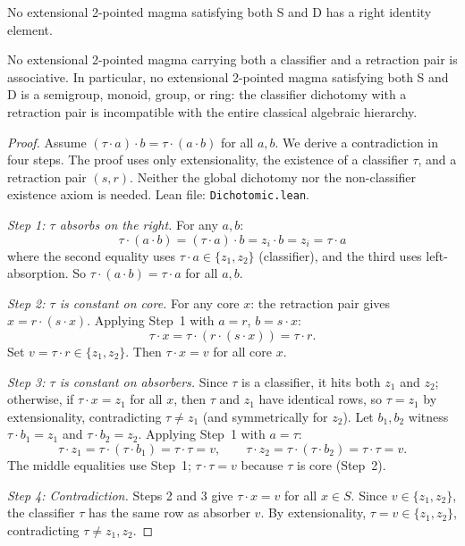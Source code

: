 \documentclass[sigconf,screen]{acmart}
\newcommand{\dotop}{\cdot}
\theoremstyle{remark}
\begin{document}
\begin{theorem}
\label{thm:no-rid}
No extensional 2-pointed magma satisfying both S and D has a right identity element.
\end{theorem}

\begin{theorem}[No Associativity]
\label{thm:no-assoc}
No extensional 2-pointed magma carrying both a classifier and a retraction pair is associative. In particular, no extensional 2-pointed magma satisfying both S and D is a semigroup, monoid, group, or ring: the classifier dichotomy with a retraction pair is incompatible with the entire classical algebraic hierarchy.
\end{theorem}

\begin{proof}
Assume $(\tau \dotop a) \dotop b = \tau \dotop (a \dotop b)$ for all $a, b$. We derive a contradiction in four steps. The proof uses only extensionality, the existence of a classifier $\tau$, and a retraction pair $(s, r)$. Neither the global dichotomy nor the non-classifier existence axiom is needed. Lean file: \texttt{Dichotomic.lean}.

\emph{Step 1: $\tau$ absorbs on the right.} For any $a, b$:
\[
\tau \dotop (a \dotop b)
= (\tau \dotop a) \dotop b
= z_i \dotop b
= z_i
= \tau \dotop a
\]
where the second equality uses $\tau \dotop a \in \{z_1, z_2\}$ (classifier), and the third uses left-absorption. So $\tau \dotop (a \dotop b) = \tau \dotop a$ for all $a, b$.

\emph{Step 2: $\tau$ is constant on core.} For any core $x$: the retraction pair gives $x = r \dotop (s \dotop x)$. Applying Step~1 with $a = r$, $b = s \dotop x$:
\[
\tau \dotop x = \tau \dotop (r \dotop (s \dotop x)) = \tau \dotop r.
\]
Set $v = \tau \dotop r \in \{z_1, z_2\}$. Then $\tau \dotop x = v$ for all core $x$.

\emph{Step 3: $\tau$ is constant on absorbers.} Since $\tau$ is a classifier, it hits both $z_1$ and $z_2$; otherwise, if $\tau \dotop x = z_1$ for all $x$, then $\tau$ and $z_1$ have identical rows, so $\tau = z_1$ by extensionality, contradicting $\tau \neq z_1$ (and symmetrically for $z_2$). Let $b_1, b_2$ witness $\tau \dotop b_1 = z_1$ and $\tau \dotop b_2 = z_2$. Applying Step~1 with $a = \tau$:
\[
\tau \dotop z_1 = \tau \dotop (\tau \dotop b_1) = \tau \dotop \tau = v,
\qquad
\tau \dotop z_2 = \tau \dotop (\tau \dotop b_2) = \tau \dotop \tau = v.
\]
The middle equalities use Step~1; $\tau \dotop \tau = v$ because $\tau$ is core (Step~2).

\emph{Step 4: Contradiction.} Steps 2 and 3 give $\tau \dotop x = v$ for all $x \in S$. Since $v \in \{z_1, z_2\}$, the classifier $\tau$ has the same row as absorber $v$. By extensionality, $\tau = v \in \{z_1, z_2\}$, contradicting $\tau \neq z_1, z_2$.
\end{proof}
\end{document}
